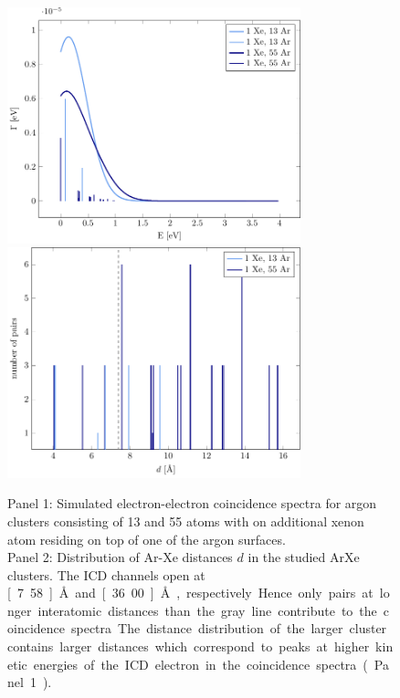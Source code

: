 \begin{figure}[h]
 \centering
 \includegraphics[width=8.5cm]{pics/surf.pdf}\\
 \includegraphics[width=8.5cm]{pics/R_comp.pdf}
 \caption{Panel 1: Simulated electron-electron coincidence spectra
          for argon clusters
          consisting of 13 and 55 atoms with on additional xenon atom residing
          on top of one of the argon surfaces.\\
          Panel 2: Distribution of Ar-Xe distances $d$ in the studied ArXe
          clusters. The ICD channels open at \unit[7.58]{\AA} and
          \unit[36.00]{\AA}, respectively. Hence only pairs at longer interatomic
          distances than the gray line contribute to the coincidence spectra.
          The distance distribution of the larger cluster contains larger
          distances which correspond to peaks at higher kinetic energies of
          the ICD electron in the coincidence spectra (Panel 1).}
 \label{figure:surf}
\end{figure}


